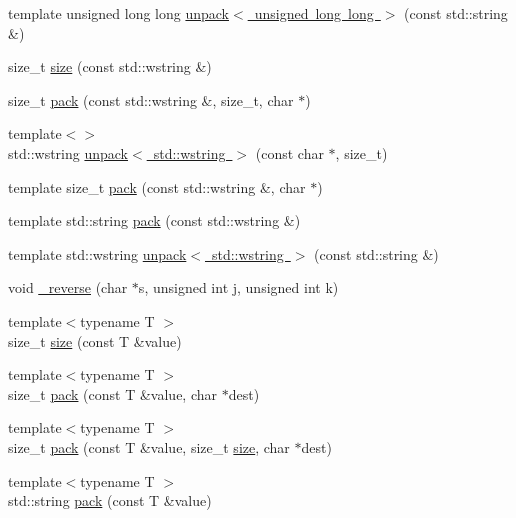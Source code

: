 \begin{DoxyCompactItemize}
\item 
template unsigned long long \mbox{\hyperlink{namespaceebml_a5ed4cbd5d003214f9e309b89ef17d630}{unpack$<$ unsigned long long $>$}} (const std\+::string \&)
\item 
size\+\_\+t \mbox{\hyperlink{namespaceebml_ab52135bc5dd3c3195dfc839bc8b551fd}{size}} (const std\+::wstring \&)
\item 
size\+\_\+t \mbox{\hyperlink{namespaceebml_afe17a10f5bbba38018c292f620088230}{pack}} (const std\+::wstring \&, size\+\_\+t, char $\ast$)
\item 
{\footnotesize template$<$$>$ }\\std\+::wstring \mbox{\hyperlink{namespaceebml_afe61c84674c5ceeaf4d19fa2f994e37b}{unpack$<$ std\+::wstring $>$}} (const char $\ast$, size\+\_\+t)
\item 
template size\+\_\+t \mbox{\hyperlink{namespaceebml_ac0fc71c240d5809912675751dc1644bf}{pack}} (const std\+::wstring \&, char $\ast$)
\item 
template std\+::string \mbox{\hyperlink{namespaceebml_ab3177fa4c2fceef733358b336d5792db}{pack}} (const std\+::wstring \&)
\item 
template std\+::wstring \mbox{\hyperlink{namespaceebml_afaec55e41b1bac6c33abe9b8707d489b}{unpack$<$ std\+::wstring $>$}} (const std\+::string \&)
\item 
void \mbox{\hyperlink{namespaceebml_ac1a0abdc17f3f647cf7d1fa990622b89}{\+\_\+reverse}} (char $\ast$s, unsigned int j, unsigned int k)
\item 
{\footnotesize template$<$typename T $>$ }\\size\+\_\+t \mbox{\hyperlink{namespaceebml_a0385005834de08a2401ec491023f9ab3}{size}} (const T \&value)
\item 
{\footnotesize template$<$typename T $>$ }\\size\+\_\+t \mbox{\hyperlink{namespaceebml_a902c75e723a22780c779a3fc1531a07f}{pack}} (const T \&value, char $\ast$dest)
\item 
{\footnotesize template$<$typename T $>$ }\\size\+\_\+t \mbox{\hyperlink{namespaceebml_a2ca9fdcd493e677f02886593a4ae63e0}{pack}} (const T \&value, size\+\_\+t \mbox{\hyperlink{namespaceebml_a75eaf24de9c90584c60e27de3b1dd63e}{size}}, char $\ast$dest)
\item 
{\footnotesize template$<$typename T $>$ }\\std\+::string \mbox{\hyperlink{namespaceebml_a8cf030e141b95cd742c465794a8faf02}{pack}} (const T \&value)
\item 

\end{DoxyCompactItemize}
